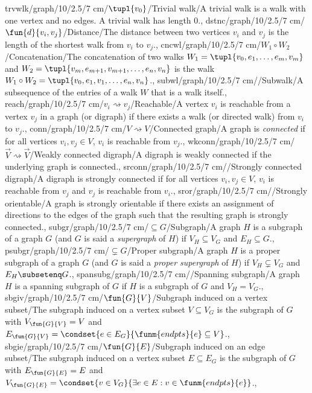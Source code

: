 trvwlk/graph/10/2.5/7 cm/{$\tupl{v_0}$}/{Trivial walk}/{A trivial walk is a walk with one vertex and no edges. A trivial walk has length $0$.},
dstnc/graph/10/2.5/7 cm/{$\fun{d}{v_i,v_j}$}/{Distance}/{The distance between two vertices $v_i$ and $v_j$ is the length of the shortest walk from $v_i$ to $v_j$.},
cncwl/graph/10/2.5/7 cm/{$W_1\circ W_2$}/{Concatenation}/{The concatenation of two walks $W_1=\tupl{v_0,e_1,\ldots,e_m,v_m}$ and $W_2=\tupl{v_m,e_{m+1},v_{m+1},\ldots,e_n,v_n}$ is the walk $W_1\circ W_2=\tupl{v_0,e_1,v_1,\ldots,e_n,v_n}$.},
subwl/graph/10/2.5/7 cm/{}/{Subwalk}/{A subsequence of the entries of a walk $W$ that is a walk itself.},
reach/graph/10/2.5/7 cm/{$v_i\rightsquigarrow v_j$}/{Reachable}/{A vertex $v_i$ is reachable from a vertex $v_j$ in a graph (or digraph) if there exists a walk (or directed walk) from $v_i$ to $v_j$.},
conn/graph/10/2.5/7 cm/{$V\rightsquigarrow V$}/{Connected graph}/{A graph is \emph{connected} if for all vertices $v_i,v_j\in V$, $v_i$ is reachable from $v_j$.},
wkconn/graph/10/2.5/7 cm/{$\vec{V}\rightsquigarrow\vec{V}$}/{Weakly connected digraph}/{A digraph is weakly connected if the underlying graph is connected.},
srconn/graph/10/2.5/7 cm/{}/{Strongly connected digraph}/{A digraph is strongly connected if for all vertices $v_i,v_j\in V$, $v_i$ is reachable from $v_j$ and $v_j$ is reachable from $v_i$.},
sror/graph/10/2.5/7 cm/{}/{Strongly orientable}/{A graph is strongly orientable if there exists an assignment of directions to the edges of the graph such that the resulting graph is strongly connected.},
subgr/graph/10/2.5/7 cm/{$\subseteq G$}/{Subgraph}/{A graph $H$ is a subgraph of a graph $G$ (and $G$ is said a \emph{supergraph} of $H$) if $V_H\subseteq V_G$ and $E_H\subseteq G$.},
psubgr/graph/10/2.5/7 cm/{$\subsetneq G$}/{Proper subgraph}/{A graph $H$ is a proper subgraph of a graph $G$ (and $G$ is said a \emph{proper supergraph} of $H$) if $V_H\subsetneq V_G$ and $E_H\subsetenq G$.},
spansubg/graph/10/2.5/7 cm/{}/{Spanning subgraph}/{A graph $H$ is a spanning subgraph of $G$ if $H$ is a subgraph of $G$ and $V_H=V_G$.},
sbgiv/graph/10/2.5/7 cm/{$\fun{G}{V}$}/{Subgraph induced on a vertex subset}/{The subgraph induced on a vertex subset $V\subseteq V_G$ is the subgraph of $G$ with $V_{\fun{G}{V}}=V$ and $E_{\fun{G}{V}}=\condset{e\in E_G}{\funm{endpts}{e}\subseteq V}$.},
sbgie/graph/10/2.5/7 cm/{$\fun{G}{E}$}/{Subgraph induced on an edge subset}/{The subgraph induced on a vertex subset $E\subseteq E_G$ is the subgraph of $G$ with $E_{\fun{G}{E}}=E$ and $V_{\fun{G}{E}}=\condset{v\in V_G}{\exists e\in E:v\in\funm{endpts}{e}}$.},
